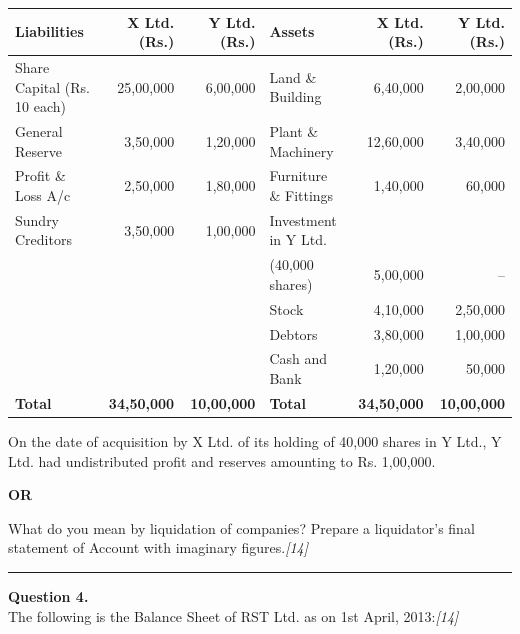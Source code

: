 \documentclass[11pt,a4paper]{article}
\newcommand{\pts}[1]{\hfill   \textit{[#1]}}
\begin{document}
\begin{center}
\small
\renewcommand{\arraystretch}{1.2}

\begin{tabular}{|l|r|r|l|r|r|}
\hline
   \textbf{Liabilities} &   \textbf{X Ltd. (Rs.)} &   \textbf{Y Ltd. (Rs.)} &   \textbf{Assets} &   \textbf{X Ltd. (Rs.)} &   \textbf{Y Ltd. (Rs.)} \\ \hline
Share Capital (Rs. 10 each) & 25,00,000 & 6,00,000 & Land \& Building & 6,40,000 & 2,00,000 \\
General Reserve & 3,50,000 & 1,20,000 & Plant \& Machinery & 12,60,000 & 3,40,000 \\
Profit \& Loss A/c & 2,50,000 & 1,80,000 & Furniture \& Fittings & 1,40,000 & 60,000 \\
Sundry Creditors & 3,50,000 & 1,00,000 & Investment in Y Ltd. & & \\
& & & (40,000 shares) & 5,00,000 & -- \\
& & & Stock & 4,10,000 & 2,50,000 \\
& & & Debtors & 3,80,000 & 1,00,000 \\
& & & Cash and Bank & 1,20,000 & 50,000 \\ \hline
   \textbf{Total} &   \textbf{34,50,000} &   \textbf{10,00,000} &   \textbf{Total} &   \textbf{34,50,000} &   \textbf{10,00,000} \\ \hline
\end{tabular}
\end{center}
On the date of acquisition by X Ltd. of its holding of 40,000 shares in Y Ltd., Y Ltd. had undistributed profit and reserves amounting to Rs. 1,00,000.

\centerline{   \textbf{OR}}

What do you mean by liquidation of companies? Prepare a liquidator's final statement of Account with imaginary figures.\pts{14}

\medskip\rule{\linewidth}{0.2pt}

\pagebreak




\noindent   \textbf{Question 4.} \\
The following is the Balance Sheet of RST Ltd. as on 1st April, 2013:\pts{14}
\end{document}
